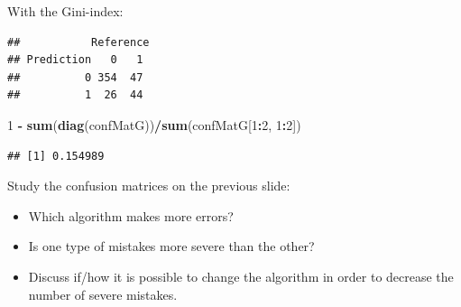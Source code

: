 \documentclass[10pt,ignorenonframetext,]{beamer}
\newenvironment{Shaded}{\begin{snugshade}}{\end{snugshade}}
\newcommand{\KeywordTok}[1]{\textcolor[rgb]{0.13,0.29,0.53}{\textbf{#1}}}
\newcommand{\DataTypeTok}[1]{\textcolor[rgb]{0.13,0.29,0.53}{#1}}
\newcommand{\DecValTok}[1]{\textcolor[rgb]{0.00,0.00,0.81}{#1}}
\newcommand{\StringTok}[1]{\textcolor[rgb]{0.31,0.60,0.02}{#1}}
\newcommand{\OperatorTok}[1]{\textcolor[rgb]{0.81,0.36,0.00}{\textbf{#1}}}
\newcommand{\NormalTok}[1]{#1}
\begin{document}
\begin{frame}[fragile]

\normalsize

With the Gini-index:

\tiny

\begin{Shaded}
\end{Shaded}

\begin{verbatim}
##           Reference
## Prediction   0   1
##          0 354  47
##          1  26  44
\end{verbatim}

\begin{Shaded}
\begin{Highlighting}[]
\DecValTok{1} \OperatorTok{-}\StringTok{ }\KeywordTok{sum}\NormalTok{(}\KeywordTok{diag}\NormalTok{(confMatG))}\OperatorTok{/}\KeywordTok{sum}\NormalTok{(confMatG[}\DecValTok{1}\OperatorTok{:}\DecValTok{2}\NormalTok{, }\DecValTok{1}\OperatorTok{:}\DecValTok{2}\NormalTok{])}
\end{Highlighting}
\end{Shaded}

\begin{verbatim}
## [1] 0.154989
\end{verbatim}

\end{frame}

\begin{frame}

Study the confusion matrices on the previous slide:

\begin{itemize}
\item
  Which algorithm makes more errors?
\item
  Is one type of mistakes more severe than the other?
\item
  Discuss if/how it is possible to change the algorithm in order to
  decrease the number of severe mistakes.
\end{itemize}

\end{frame}
\end{document}
